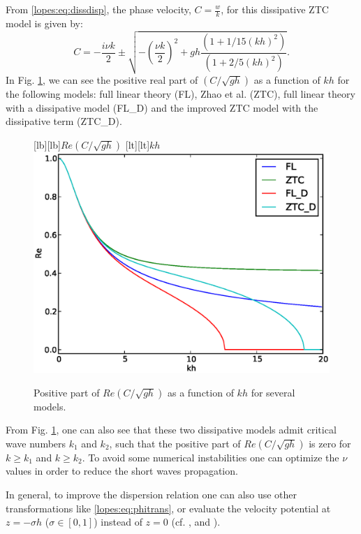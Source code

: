 From \eqref{lopes:eq:dissdisp}, the
 phase velocity, \(\displaystyle C=\frac{w}{k}\),  for this dissipative ZTC model is
 given by:
\begin{equation}
C=-\frac{i\nu k}{2}\pm\sqrt{-\left(\frac{\nu k}{2}\right)^2+gh\frac{(1+1/15(kh)^2)}{(1+2/5(kh)^2)}}.
\end{equation}
In Fig. \ref{lopes:fig:dispersion}, we can see the positive real
part
of \(\displaystyle\left(C/\sqrt{gh}\right)\) as a function of \(kh\) for the following models:
  full linear theory (FL),
Zhao et al. (ZTC), full linear theory with a
dissipative model (FL\_D) and the
improved  ZTC model with the dissipative term (ZTC\_D).
  \begin{figure}[!htb]
{\centering
{}[lb][lb]{$Re\left(C/\sqrt{gh}\right)$}
[lt][lt]{$kh$}
\includegraphics[width=\largewidth]{chapters/lopes/eps/dispersion.eps}
\caption{Positive  part of \(\displaystyle
Re\left(C/\sqrt{gh}\right)\) as a function of \(kh\) for several models.}
\label{lopes:fig:dispersion}\par}
\end{figure}
From Fig. \ref{lopes:fig:dispersion}, one can also see that
  these two dissipative models  admit
critical wave numbers \(k_1\) and \(k_2\),
such that the positive  part of \(\displaystyle Re\left(C/\sqrt{gh}\right)\) is zero
for \(k\geq k_1\) and \(k\geq k_2\).
To avoid some numerical instabilities one can optimize
 the \(\nu\) values in order
 to reduce  the short waves propagation.


In general, to improve the dispersion relation one can also use other
 transformations like \eqref{lopes:eq:phitrans}, or evaluate the
 velocity potential at \(z=-\sigma h\) (\(\sigma\in[0,1]\))
 instead of  \(z=0\) (cf. \cite{BinghamMadsenEtAl2008}, \cite{MadsenAgnon2003} and \cite{MadsenBinghamEtAl2003}).

